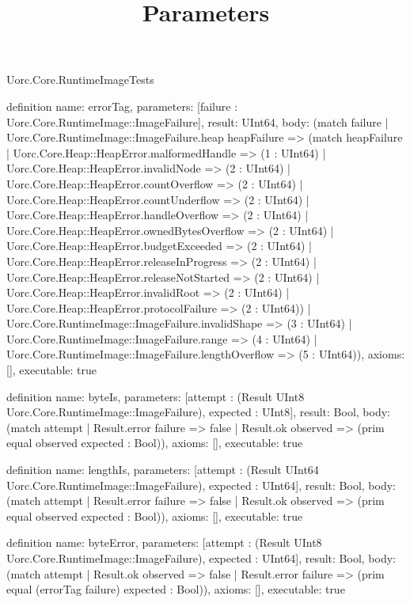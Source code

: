 \begin{lexlean}{Uorc.Core.RuntimeImageTests}





\title{Parameters}

\begin{semanticmodule}
definition{
  name: errorTag,
  parameters: [failure : Uorc.Core.RuntimeImage::ImageFailure],
  result: UInt64,
  body: (match failure
    | Uorc.Core.RuntimeImage::ImageFailure.heap heapFailure => (match heapFailure
      | Uorc.Core.Heap::HeapError.malformedHandle => (1 : UInt64)
      | Uorc.Core.Heap::HeapError.invalidNode => (2 : UInt64)
      | Uorc.Core.Heap::HeapError.countOverflow => (2 : UInt64)
      | Uorc.Core.Heap::HeapError.countUnderflow => (2 : UInt64)
      | Uorc.Core.Heap::HeapError.handleOverflow => (2 : UInt64)
      | Uorc.Core.Heap::HeapError.ownedBytesOverflow => (2 : UInt64)
      | Uorc.Core.Heap::HeapError.budgetExceeded => (2 : UInt64)
      | Uorc.Core.Heap::HeapError.releaseInProgress => (2 : UInt64)
      | Uorc.Core.Heap::HeapError.releaseNotStarted => (2 : UInt64)
      | Uorc.Core.Heap::HeapError.invalidRoot => (2 : UInt64)
      | Uorc.Core.Heap::HeapError.protocolFailure => (2 : UInt64))
    | Uorc.Core.RuntimeImage::ImageFailure.invalidShape => (3 : UInt64)
    | Uorc.Core.RuntimeImage::ImageFailure.range => (4 : UInt64)
    | Uorc.Core.RuntimeImage::ImageFailure.lengthOverflow => (5 : UInt64)),
  axioms: [],
  executable: true
}

definition{
  name: byteIs,
  parameters: [attempt : (Result UInt8 Uorc.Core.RuntimeImage::ImageFailure), expected : UInt8],
  result: Bool,
  body: (match attempt
    | Result.error failure => false
    | Result.ok observed => (prim equal observed expected : Bool)),
  axioms: [],
  executable: true
}

definition{
  name: lengthIs,
  parameters: [attempt : (Result UInt64 Uorc.Core.RuntimeImage::ImageFailure), expected : UInt64],
  result: Bool,
  body: (match attempt
    | Result.error failure => false
    | Result.ok observed => (prim equal observed expected : Bool)),
  axioms: [],
  executable: true
}

definition{
  name: byteError,
  parameters: [attempt : (Result UInt8 Uorc.Core.RuntimeImage::ImageFailure), expected : UInt64],
  result: Bool,
  body: (match attempt
    | Result.ok observed => false
    | Result.error failure => (prim equal (errorTag failure) expected : Bool)),
  axioms: [],
  executable: true
}


\end{semanticmodule}
\end{lexlean}
